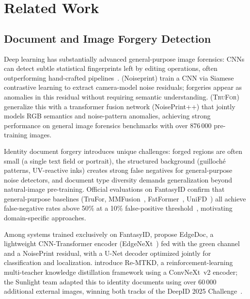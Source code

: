
\section{Related Work}
\label{sec:related}

\subsection{Document and Image Forgery Detection}

Deep learning has substantially advanced general-purpose image forensics:
CNNs can detect subtle statistical fingerprints left by editing operations,
often outperforming hand-crafted pipelines~\citep{bappy2019hybrid, mantranet2019}.
\citet{cozzolino2020noiseprint} (Noiseprint) train a CNN via Siamese
contrastive learning to extract camera-model noise residuals; forgeries appear
as anomalies in this residual without requiring semantic understanding.
\citet{trufor2023} (\textsc{TruFor}) generalize this with a transformer fusion
network (NoisePrint++) that jointly models RGB semantics and noise-pattern
anomalies, achieving strong performance on general image forensics benchmarks
with over 876\,000 pre-training images.

Identity document forgery introduces unique challenges: forged regions are
often small (a single text field or portrait), the structured background
(guilloché patterns, UV-reactive inks) creates strong false negatives for
general-purpose noise detectors, and document type diversity demands
generalization beyond natural-image pre-training. Official evaluations on
FantasyID confirm that general-purpose baselines (TruFor, MMFusion~\citep{mmfusion2024},
FatFormer~\citep{fatformer2024}, UniFD~\citep{unifd2023}) all achieve
false-negative rates above 50\% at a 10\% false-positive
threshold~\citep{fantasyid2024}, motivating domain-specific approaches.

Among systems trained exclusively on FantasyID, \citet{edgedoc2025} propose
EdgeDoc, a lightweight CNN-Transformer encoder (EdgeNeXt~\citep{edgenext2022}) fed with the green
channel and a NoisePrint residual, with a U-Net decoder optimized jointly for
classification and localization. \citet{remtkd2025} introduce Re-MTKD, a
reinforcement-learning multi-teacher knowledge distillation framework using a
ConvNeXt~v2 encoder; the Sunlight team adapted this to identity documents using
over 60\,000 additional external images, winning both tracks of the DeepID
2025 Challenge~\citep{deepid2025challenge}.

